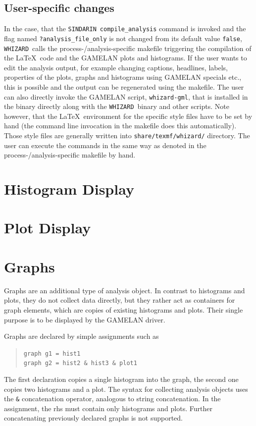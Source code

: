 \documentclass[12pt]{book}
\newcommand{\ttt}[1]{\texttt{#1}}
\newcommand{\whizard}{\ttt{WHIZARD}}
\newcommand{\sindarin}{\ttt{SINDARIN}}
\begin{document}
\subsection{User-specific changes}

In the case, that the \sindarin\ \ttt{compile\_analysis} command is
invoked and the flag named \ttt{?analysis\_file\_only} is not changed
from its default value \ttt{false}, \whizard\ calls the
process-/analysis-specific makefile triggering the compilation of the
\LaTeX\ code and the GAMELAN plots and histograms. If the user wants
to edit the analysis output, for example changing captions, headlines,
labels, properties of the plots, graphs and histograms using GAMELAN
specials etc., this is possible and the output can be regenerated
using the makefile. The user can also directly invoke the GAMELAN
script, \ttt{whizard-gml}, that is installed in the binary directly
along with the \whizard\ binary and other scripts. Note however, that
the \LaTeX\ environment for the specific style files have to be set by
hand (the command line invocation in the makefile does this
automatically). Those style files are generally written into
\ttt{share/texmf/whizard/} directory. The user can execute the
commands in the same way as denoted in the process-/analysis-specific
makefile by hand.



\section{Histogram Display}



\section{Plot Display}


\section{Graphs}
\label{sec:graphs}

Graphs are an additional type of analysis object.  In contrast to histograms
and plots, they do not collect data directly, but they rather act as
containers for graph elements, which are copies of existing histograms and
plots.  Their single purpose is to be displayed by the GAMELAN driver.

Graphs are declared by simple assignments such as
\begin{quote}
  \begin{footnotesize}
    \ttt{graph g1 = hist1}
\\
    \ttt{graph g2 = hist2 \& hist3 \& plot1}
  \end{footnotesize}
\end{quote}
The first declaration copies a single histogram into the graph, the second one
copies two histograms and a plot.  The syntax for collecting analysis objects
uses the \ttt{\&} concatenation operator, analogous to string concatenation.
In the assignment, the rhs must contain only histograms and plots.  Further
concatenating previously declared graphs is not supported.
\end{document}
